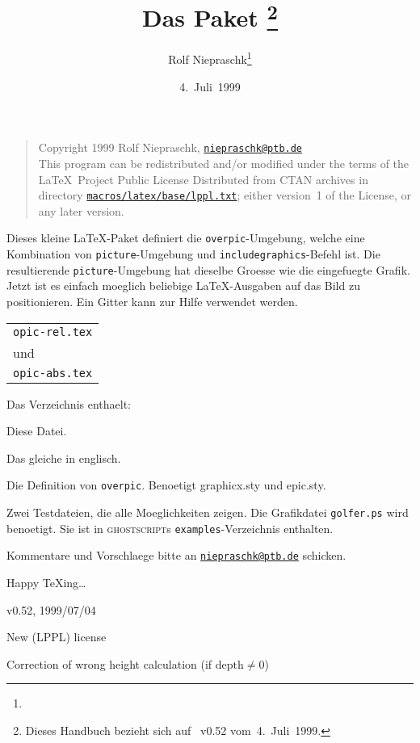 \documentclass[german, pagesize=auto, fontsize=12pt, parskip=half, DIV=11]{scrartcl}
\title{Das Paket \pkg{overpic}\thanks{Dieses Handbuch bezieht sich auf \pkg{overpic}~v0.52 vom~4.~Juli~1999.}}
\author{Rolf Niepraschk\thanks{\mail{niepraschk@ptb.de}}}
\date{4.~Juli~1999}
\newcommand*{\mail}[1]{\href{mailto:#1}{\texttt{#1}}}
\newcommand*{\pkg}[1]{\textsf{#1}}
\newcommand*{\env}[1]{\texttt{#1}}
\begin{document}
\maketitle

\noindent

\begin{quote}
  \footnotesize
  Copyright  1999 Rolf Niepraschk, \mail{niepraschk@ptb.de}\\
  This program can be redistributed and/or modified under the terms
  of the \LaTeX\ Project Public License Distributed from CTAN
  archives in directory \href{http://ctan.org/macros/latex/base/lppl.txt}{\texttt{macros/latex/base\slash lppl.txt}}; either
  version~1 of the License, or any later version.
\end{quote}

Dieses kleine \LaTeX-Paket definiert die \env{overpic}-Umgebung, welche eine
Kombination von \env{picture}-Umgebung und \env{includegraphics}-Befehl ist. Die
resultierende \env{picture}-Umgebung hat dieselbe Groesse wie die eingefuegte Grafik.
Jetzt ist es einfach moeglich beliebige \LaTeX-Ausgaben auf das Bild zu
positionieren. Ein Gitter kann zur Hilfe verwendet werden.

\begin{lrbox}{\tempbox}
  \begin{tabular}[b]{@{}l@{}}
    \texttt{opic-rel.tex} \\
    und                   \\
    \texttt{opic-abs.tex}
  \end{tabular}
\end{lrbox}

Das Verzeichnis enthaelt:
%
\begin{labeling}[\hspace{\labelsep}--]{\usebox{\tempbox}}
\item[\texttt{README.de}] Diese Datei.
\item[\texttt{README}] Das gleiche in englisch.
\item[\texttt{overpic.sty}] Die Definition von \env{overpic}. Benoetigt \pkg{graphicx.sty} und \pkg{epic.sty}.
\item[\usebox{\tempbox}] Zwei Testdateien, die alle Moeglichkeiten zeigen. Die Grafikdatei \texttt{golfer.ps} wird benoetigt. Sie ist in \textsc{ghostscript}s \texttt{examples}-Verzeichnis enthalten.
\end{labeling}
               
Kommentare und Vorschlaege bitte an \mail{niepraschk@ptb.de} schicken.

Happy \TeX ing\ldots

\enlargethispage{\baselineskip}



\begin{labeling}[\hspace{\labelsep}--]{v0.52, 1999/07/04}
  \item[v0.51, 1999/03/02] New (LPPL) license
  \item[v0.52, 1999/07/04] Correction of wrong height calculation (if $\mathrm{depth} \ne 0$)
\end{labeling}
\end{document}
